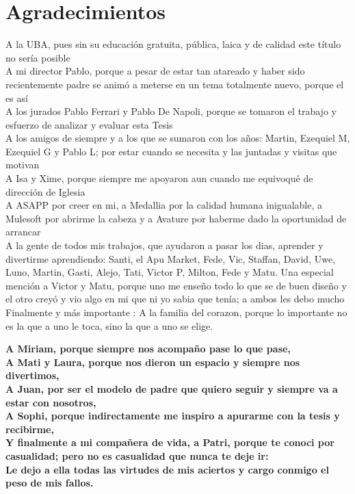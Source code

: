 
\bigskip

\begingroup
\let\clearpage\relax
\let\cleardoublepage\relax
\let\cleardoublepage\relax
\chapter*{Agradecimientos}

\begin{center}
A la UBA, pues sin su educaci\'on gratuita, p\'ublica, laica y de calidad este t\'itulo no ser\'ia posible \\
A mi director Pablo, porque a pesar de estar tan atareado y haber sido recientemente padre se anim\'o a meterse en un tema totalmente nuevo, porque el es as\'i \\
A los jurados Pablo Ferrari y Pablo De Napoli, porque se tomaron el trabajo y esfuerzo de analizar y evaluar esta Tesis \\
A los amigos de siempre y a los que se sumaron con los a\~nos: Martin, Ezequiel M, Ezequiel G y Pablo L; por estar cuando se necesita y las juntadas y visitas que motivan \\
A Isa y Xime, porque siempre me apoyaron aun cuando me equivoqu\'e de direcci\'on de Iglesia \\
A ASAPP por creer en mi, a Medallia por la calidad humana inigualable, a Mulesoft por abrirme la cabeza y a Avature por haberme dado la oportunidad de arrancar\\
A la gente de todos mis trabajos, que ayudaron a pasar los dias, aprender y divertirme aprendiendo: Santi, el Apu Market, Fede, Vic, Staffan, David, Uwe, Luno, Martin, Gasti, Alejo, Tati, Victor P, Milton, Fede y Matu. 
Una especial menci\'on a Victor y Matu, porque uno me ense\~no todo lo que se de buen dise\~no y el otro crey\'o y vio algo en mi que ni yo sabia que ten\'ia; a ambos les debo mucho\\
Finalmente y m\'as importante : A la familia del corazon, porque lo importante no es la que a uno le toca, sino la que a uno se elige.
\linebreak
\linebreak

\textbf{
A Miriam, porque siempre nos acompa\~no pase lo que pase, \\
A Mati y Laura, porque nos dieron un espacio y siempre nos divertimos, \\
A Juan, por ser el modelo de padre que quiero seguir y siempre va a estar con nosotros, \\
A Sophi, porque indirectamente me inspiro a apurarme con la tesis y recibirme, \\
Y finalmente a mi compa\~nera de vida, a Patri, porque te conoci por casualidad; pero no es casualidad que nunca te deje ir: \\
Le dejo a ella todas las virtudes de mis aciertos y cargo conmigo el peso de mis fallos.
}
\end{center}
\endgroup



